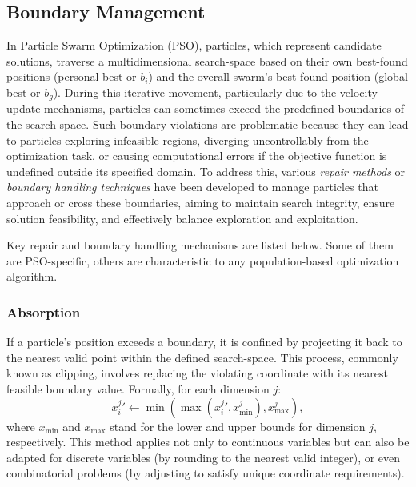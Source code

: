 {%






\subsection{Boundary Management}

In Particle Swarm Optimization (PSO), particles, which represent candidate solutions, traverse a multidimensional \gls{search-space} based on their own best-found positions (personal best or $b_i$) and the overall swarm's best-found position (global best or $b_g$). During this iterative movement, particularly due to the velocity update mechanisms, particles can sometimes exceed the predefined boundaries of the \gls{search-space}. Such boundary violations are problematic because they can lead to particles exploring infeasible regions, diverging uncontrollably from the optimization task, or causing computational errors if the objective function is undefined outside its specified domain. To address this, various \textit{repair methods} or \textit{boundary handling techniques} have been developed to manage particles that approach or cross these boundaries, aiming to maintain search integrity, ensure solution feasibility, and effectively balance exploration and exploitation.

Key repair and boundary handling mechanisms are listed below. Some of them are PSO-specific, others are characteristic to any population-based optimization algorithm.

\subsubsection{Absorption}
    
    If a particle’s position exceeds a boundary, it is confined by projecting it back to the nearest valid point within the defined \gls{search-space}. This process, commonly known as clipping, involves replacing the violating coordinate with its nearest feasible boundary value. Formally, for each dimension $j$:
    \begin{equation}
        x_{i}^{j}{}' \leftarrow \min(\max(x_{i}^{j}{}', x_{\min}^{j}), x_{\max}^{j}),
    \end{equation}
    where $x_{\min}$ and $x_{\max}$ stand for the lower and upper bounds for dimension $j$, respectively.
    This method applies not only to continuous variables but can also be adapted for discrete variables (by rounding to the nearest valid integer), or even combinatorial problems (by adjusting to satisfy unique coordinate requirements).
    
}
